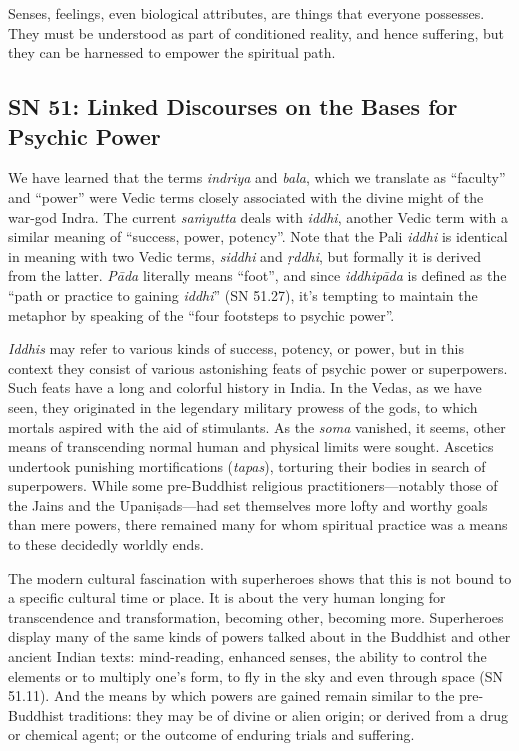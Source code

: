 \documentclass[12pt,openany]{book}%
\begin{document}
Senses, feelings, even biological attributes, are things that everyone possesses. They must be understood as part of conditioned reality, and hence suffering, but they can be harnessed to empower the spiritual path.

\subsection*{SN 51: Linked Discourses on the Bases for Psychic Power}

We have learned that the terms \textit{indriya} and \textit{bala}, which we translate as “faculty” and “power” were Vedic terms closely associated with the divine might of the war-god Indra. The current \textit{\textsanskrit{saṁyutta}} deals with \textit{iddhi}, another Vedic term with a similar meaning of “success, power, potency”. Note that the Pali \textit{iddhi} is identical in meaning with two Vedic terms, \textit{siddhi} and \textit{\textsanskrit{ṛddhi}}, but formally it is derived from the latter. \textit{\textsanskrit{Pāda}} literally means “foot”, and since \textit{\textsanskrit{iddhipāda}} is defined as the “path or practice to gaining \textit{iddhi}” (SN 51.27), it’s tempting to maintain the metaphor by speaking of the “four footsteps to psychic power”.

\textit{Iddhis} may refer to various kinds of success, potency, or power, but in this context they consist of various astonishing feats of psychic power or superpowers. Such feats have a long and colorful history in India. In the Vedas, as we have seen, they originated in the legendary military prowess of the gods, to which mortals aspired with the aid of stimulants. As the \textit{soma} vanished, it seems, other means of transcending normal human and physical limits were sought. Ascetics undertook punishing mortifications (\textit{tapas}), torturing their bodies in search of superpowers. While some pre-Buddhist religious practitioners—notably those of the Jains and the \textsanskrit{Upaniṣads}—had set themselves more lofty and worthy goals than mere powers, there remained many for whom spiritual practice was a means to these decidedly worldly ends.

The modern cultural fascination with superheroes shows that this is not bound to a specific cultural time or place. It is about the very human longing for transcendence and transformation, becoming other, becoming more. Superheroes display many of the same kinds of powers talked about in the Buddhist and other ancient Indian texts: mind-reading, enhanced senses, the ability to control the elements or to multiply one’s form, to fly in the sky and even through space (SN 51.11). And the means by which powers are gained remain similar to the pre-Buddhist traditions: they may be of divine or alien origin; or derived from a drug or chemical agent; or the outcome of enduring trials and suffering.
\end{document}
